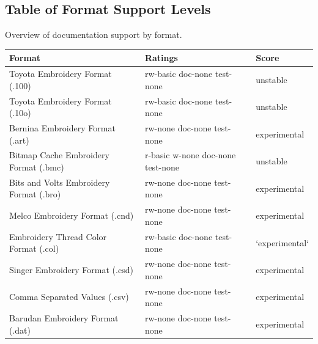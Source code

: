 \documentclass{report}
\begin{document}
\subsection{Table of Format Support Levels}

Overview of documentation support by format.

\begin{tabular}{l l l}
Format & Ratings & Score \\
\hline
Toyota Embroidery Format (.100) & rw-basic doc-none test-none & unstable \\
Toyota Embroidery Format (.10o) & rw-basic doc-none test-none & unstable \\
Bernina Embroidery Format (.art) & rw-none doc-none test-none & experimental \\
Bitmap Cache Embroidery Format (.bmc) & r-basic w-none doc-none test-none & unstable \\
Bits and Volts Embroidery Format (.bro) & rw-none doc-none test-none & experimental \\
Melco Embroidery Format (.cnd) & rw-none doc-none test-none & experimental \\
Embroidery Thread Color Format (.col) & rw-basic doc-none test-none & `experimental` \\
Singer Embroidery Format (.csd) & rw-none doc-none test-none & experimental \\
Comma Separated Values (.csv) & rw-none doc-none test-none & experimental \\
Barudan Embroidery Format (.dat) & rw-none doc-none test-none & experimental \end{tabular}
\end{document}
